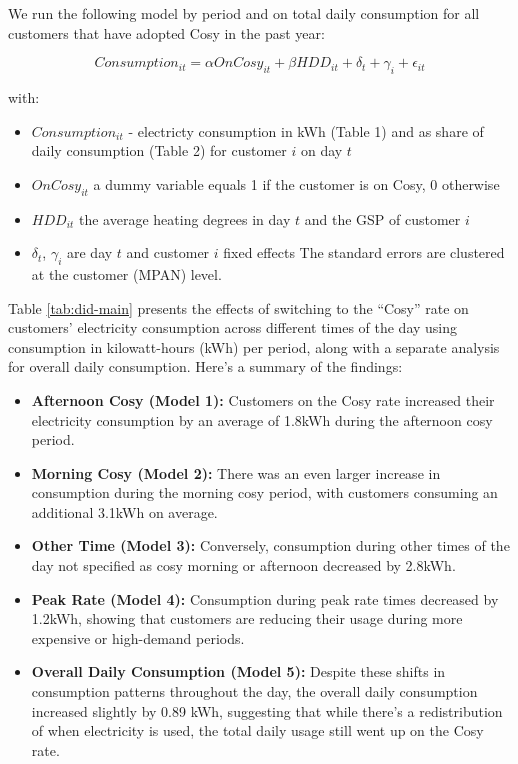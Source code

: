 \documentclass[
]{article}
\providecommand{\tightlist}{%
  \setlength{\itemsep}{0pt}\setlength{\parskip}{0pt}}
\begin{document}
We run the following model by period and on total daily consumption for all customers that have adopted Cosy in the past year:

\begin{equation} 
\label{simple-did}
Consumption_{it} = \alpha OnCosy_{it} + \beta HDD_{it} + \delta_t +  \gamma_i +  \epsilon_{it} 
\end{equation}

with:

\begin{itemize}
\tightlist
\item
  \(Consumption_{it}\) - electricty consumption in kWh (Table 1) and as share of daily consumption (Table 2) for customer \(i\) on day \(t\)
\item
  \(OnCosy_{it}\) a dummy variable equals 1 if the customer is on Cosy, 0 otherwise
\item
  \(HDD_{it}\) the average heating degrees in day \(t\) and the GSP of customer \(i\)
\item
  \(\delta_t\), \(\gamma_i\) are day \(t\) and customer \(i\) fixed effects
  The standard errors are clustered at the customer (MPAN) level.
\end{itemize}

Table \ref{tab:did-main} presents the effects of switching to the ``Cosy'' rate on customers' electricity consumption across different times of the day using consumption in kilowatt-hours (kWh) per period, along with a separate analysis for overall daily consumption. Here's a summary of the findings:

\begin{itemize}
\tightlist
\item
  \textbf{Afternoon Cosy (Model 1):} Customers on the Cosy rate increased their electricity consumption by an average of 1.8kWh during the afternoon cosy period.
\item
  \textbf{Morning Cosy (Model 2):} There was an even larger increase in consumption during the morning cosy period, with customers consuming an additional 3.1kWh on average.
\item
  \textbf{Other Time (Model 3):} Conversely, consumption during other times of the day not specified as cosy morning or afternoon decreased by 2.8kWh.
\item
  \textbf{Peak Rate (Model 4):} Consumption during peak rate times decreased by 1.2kWh, showing that customers are reducing their usage during more expensive or high-demand periods.
\item
  \textbf{Overall Daily Consumption (Model 5):} Despite these shifts in consumption patterns throughout the day, the overall daily consumption increased slightly by 0.89 kWh, suggesting that while there's a redistribution of when electricity is used, the total daily usage still went up on the Cosy rate.
\end{itemize}
\end{document}
